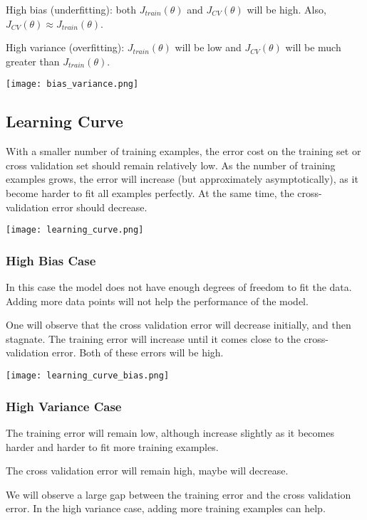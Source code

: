 High bias (underfitting): both $J_{train}(\theta)$ and $J_{CV}(\theta)$ will be high. Also, $J_{CV}(\theta)\approx J_{train}(\theta)$.

High variance (overfitting): $J_{train}(\theta)$ will be low and $J_{CV}(\theta)$ will be much greater than $J_{train}(\theta)$.

\texttt{[image: bias\_variance.png]}

\subsection{Learning Curve}

With a smaller number of training examples, the error cost on the training set or cross validation set should remain relatively low. As the number of training examples grows, the error will increase (but approximately asymptotically), as it become harder to fit all examples perfectly. At the same time, the cross-validation error should decrease.

\texttt{[image: learning\_curve.png]}

\subsubsection{High Bias Case}

In this case the model does not have enough degrees of freedom to fit the data. Adding more data points will not help the performance of the model. 

One will observe that the cross validation error will decrease initially, and then stagnate. 
The training error will increase until it comes close to the cross-validation error.
Both of these errors will be high.

\texttt{[image: learning\_curve\_bias.png]} 

\subsubsection{High Variance Case}

The training error will remain low, although increase slightly as it becomes harder and harder to fit more training examples.

The cross validation error will remain high, maybe will decrease.

We will observe a large gap between the training error and the cross validation error. In the high variance case, adding more training examples can help.

